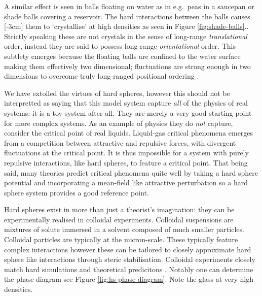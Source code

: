 \documentclass[11pt,twoside]{report}
\begin{document}
A similar effect is seen in balls floating on water as in e.g.\ peas in a saucepan or shade balls covering a reservoir.
The hard interactions between the balls causes%
[-3cm]
them to `crystallise' at high densities as seen in Figure \ref{fig:shade-balls}..
Strictly speaking these are not crystals in the sense of long-range \emph{translational} order, instead they are said to possess long-range \emph{orientational} order.
This subtlety emerges because the floating balls are confined to the water surface making them effectively two dimensional; fluctuations are strong enough in two dimensions to overcome truly long-ranged positional ordering \cite{MerminPRL1966,MerminPR1968}.

We have extolled the virtues of hard spheres, however this should not be interpretted as saying that this model system capture \emph{all} of the physics of real systems: it is a toy system after all.
They are merely a very good starting point for more complex systems.
As an example of physics they do \emph{not} capture, consider the critical point of real liquids.
Liquid-gas critical phenomena emerges from a competition between attractive and repulsive forces, with divergent fluctuations at the critical point.
It is thus impossible for a system with purely repulsive interactions, like hard spheres, to feature a critical point.
That being said, many theories predict critical phenomena quite well by taking a hard sphere potential and incorporating a mean-field like attractive perturbation \cite{?} so a hard sphere system provides a good reference point.

Hard spheres exist in more than just a theorist's imagination: they can be experimentally realised in colloidal experiments.
Colloidal suspensions are mixtures of solute immersed in a solvent composed of much smaller particles.
Colloidal particles are typically at the micron-scale.
These typically feature complex interactions \cite{Royall?,?,?} however these can be tailored to closely approximate hard sphere like interactions through steric stabilisation.
Colloidal experiments closely match hard simulations and theoretical predicitons \cite{?}.
Notably one can determine the phase diagram see Figure \ref{fig:hs-phase-diagram}.
Note the glass at very high densities.
\end{document}
